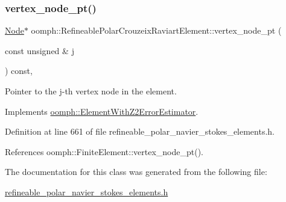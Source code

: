 \mbox{\label{classoomph_1_1RefineablePolarCrouzeixRaviartElement_a1de048c6cb46845803026af04082457a}} 
\subsubsection{\texorpdfstring{vertex\+\_\+node\+\_\+pt()}{vertex\_node\_pt()}}
{\footnotesize\ttfamily \hyperlink{classoomph_1_1Node}{Node}$\ast$ oomph\+::\+Refineable\+Polar\+Crouzeix\+Raviart\+Element\+::vertex\+\_\+node\+\_\+pt (\begin{DoxyParamCaption}\item[{const unsigned \&}]{j }\end{DoxyParamCaption}) const\hspace{0.3cm}{\ttfamily [inline]}, {\ttfamily [virtual]}}



Pointer to the j-\/th vertex node in the element. 



Implements \hyperlink{classoomph_1_1ElementWithZ2ErrorEstimator_a0eedccc33519f852c5dc2055ddf2774b}{oomph\+::\+Element\+With\+Z2\+Error\+Estimator}.



Definition at line 661 of file refineable\+\_\+polar\+\_\+navier\+\_\+stokes\+\_\+elements.\+h.



References oomph\+::\+Finite\+Element\+::vertex\+\_\+node\+\_\+pt().



The documentation for this class was generated from the following file\+:\begin{DoxyCompactItemize}
\item 
\hyperlink{refineable__polar__navier__stokes__elements_8h}{refineable\+\_\+polar\+\_\+navier\+\_\+stokes\+\_\+elements.\+h}\end{DoxyCompactItemize}
